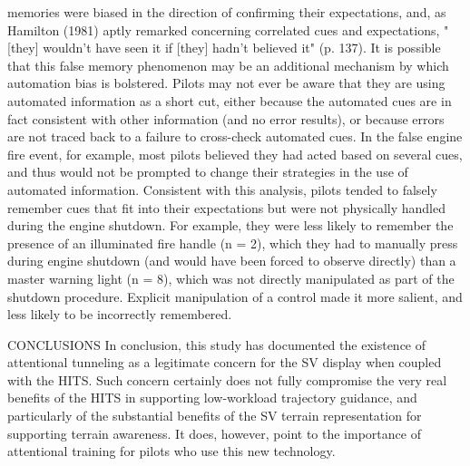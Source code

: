 \documentclass[utf8,bachelor,manualbib]{gradu3}
\begin{document}
memories were biased in the direction of confirming their expectations, and, as
Hamilton (1981) aptly remarked concerning correlated cues and expectations,
"[they] wouldn't have seen it if [they] hadn't believed it" (p. 137).
It is possible that this false memory phenomenon may be an additional mechanism
by which automation bias is bolstered. Pilots may not ever be aware that they
are using automated information as a short cut, either because the automated cues
are in fact consistent with other information (and no error results), or because errors
are not traced back to a failure to cross-check automated cues. In the false engine
fire event, for example, most pilots believed they had acted based on several cues,
and thus would not be prompted to change their strategies in the use of automated
information. Consistent with this analysis, pilots tended to falsely remember cues
that fit into their expectations but were not physically handled during the engine
shutdown. For example, they were less likely to remember the presence of an
illuminated fire handle (n = 2), which they had to manually press during engine
shutdown (and would have been forced to observe directly) than a master warning
light (n = 8), which was not directly manipulated as part of the shutdown procedure.
Explicit manipulation of a control made it more salient, and less likely to be
incorrectly remembered. \citep{mosierym1998}

CONCLUSIONS
In conclusion, this study has documented the existence of attentional tunneling as a
legitimate concern for the SV display when coupled with the HITS. Such concern certainly does not fully compromise the very real benefits of the HITS in supporting
low-workload trajectory guidance, and particularly of the substantial benefits of the
SV terrain representation for supporting terrain awareness. It does, however, point to
the importance of attentional training for pilots who use this new technology. \citep{wickens2009}

\end{document}
